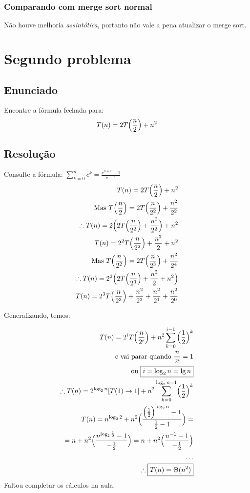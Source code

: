 \documentclass{article}
\newcommand{\lp}{\Bigl(}
\newcommand{\rp}{\Bigr)}
\begin{document}
\subsubsection{Comparando com merge sort normal}

Não houve melhoria \textit{assintótica}, portanto não vale a pena atualizar o merge sort.

\section{Segundo problema}
\subsection{Enunciado}
Encontre a fórmula fechada para:
\begin{align*}
    T(n) = 2T\Bigl(\frac{n}{2}\Bigr)+n^2
\end{align*}
\subsection{Resolução}

Consulte a fórmula: $\sum^n_{k=0}{c^k} = \frac{c^{n+1} - 1 }{c - 1}$
\begin{align*}
    T(n) = 2T\Bigl(\frac{n}{2}\Bigr)+n^2 \\
    \text{Mas }T\Bigl(\frac{n}{2}\Bigr) = 2T\Bigl(\frac{n}{2^2}\Bigr) + \frac{n^2}{2^2} \\
    \therefore T(n) = 2\Bigl(2T\Bigl(\frac{n}{2^2}\Bigr) + \frac{n^2}{2^2} \Bigr) + n^2 \\
    T(n) = 2^2 T\Bigl( \frac{n}{2^2}\Bigr) + \frac{n^2}{2} + n^2 \\
    \text{Mas } T\Bigl(\frac{n}{2^2}\Bigr) = 2T\Bigl(\frac{n}{2^3}\rp + \frac{n^2}{2^4} \\
    \therefore T(n) = 2^2\lp 2T \lp \frac{n}{2^3} \rp + \frac{n^2}{2} + n^2 \rp\\
    T(n) = 2^3T \lp \frac{n}{2^3} \rp + \frac{n^2}{2^2} + \frac{n^2}{2^1} + \frac{n^2}{2^0}
\end{align*}

Generalizando, temos:

\begin{align*}
    T(n) = 2^i T\lp \frac{n}{2^i}\rp + n^2 \sum^{i-1}_{k=0}{\lp \frac{1}{2}\rp^k} \\
    \text{e vai parar quando } \frac{n}{2^i} = 1 \\
    \text{ou } \boxed{i = \log_2 n = \lg n} \\
    \therefore T(n) = 2^{\log_2 n} [T(1) \rightarrow 1] + n^2 \sum^{\log_2 n = 1}_{k = 0}\lp \frac{1}{2} \rp^k \\
    T(n) = n^{\log_2 2} + n^2 \lp \frac{\lp \frac{1}{2} \rp^{\log_2 n} - 1}{\frac{1}{2} - 1} \rp =  \\
    = n + n^2 \lp \frac{n^{\log_2 \frac{1}{2}} - 1}{-\frac{1}{2}}\rp = n + n^2 \lp \frac{n^{-1} - 1}{-\frac{1}{2}}\rp \\
    \dots \\
    \therefore \boxed{T(n) = \Theta(n^2)}
\end{align*}
Faltou completar os cálculos na aula.
\end{document}
